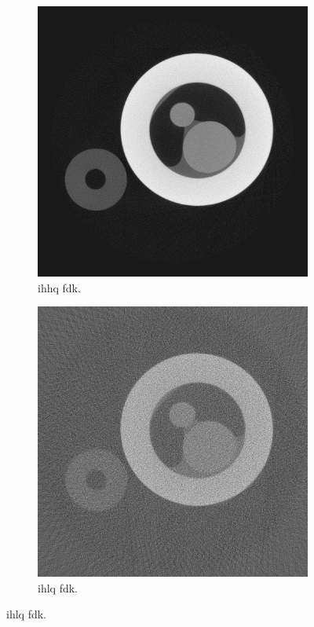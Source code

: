 \begin{figure}
    \begin{subfigure}[t]{.45\textwidth}
      \centering
      \includegraphics[width=\linewidth]{figures/kimrobertgt.png}
      \caption{\acrlong{ihhq} \acrshort{fdk}. }
    \end{subfigure}
    \hfill
    \begin{subfigure}[t]{.45\textwidth}
      \centering
      \includegraphics[width=\linewidth]{figures/kimrobertFDK.png}
      \caption{\acrlong{ihlq} \acrshort{fdk}.}
    \end{subfigure}
  

\end{figure}
